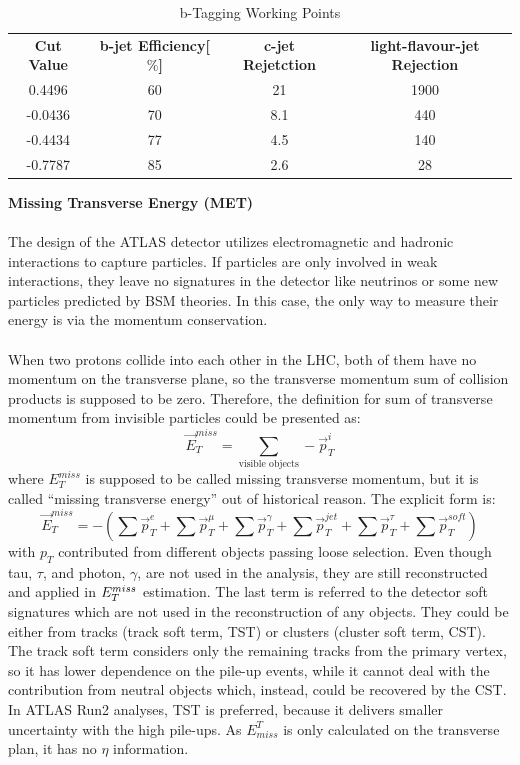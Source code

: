 \begin{table}[h]
	\caption{b-Tagging Working Points}
	\renewcommand{\arraystretch}{1.5}
	\centering
	\begin{adjustbox}{center}
		\begin{tabular}{|c | c | c | c |}
			\hline
			\hline
			{\bf Cut Value}    & {\bf b-jet Efficiency[$\%$]}  & {\bf c-jet Rejetction} & {\bf light-flavour-jet Rejection}\\
			0.4496 & 60 & 21 & 1900 \\
			-0.0436& 70 & 8.1& 440 \\
			-0.4434& 77 & 4.5&  140 \\
			-0.7787& 85 & 2.6&  28 \\
			\hline
		\end{tabular}
	\end{adjustbox}
	\label{Tab:b-tag}
\end{table}		
\noindent
{\bf Missing Transverse Energy (MET)}
\\
\\The design of the ATLAS detector utilizes electromagnetic and hadronic interactions to capture particles. If particles are only involved in weak interactions, they leave no signatures in the detector like neutrinos or some new particles predicted by BSM theories. In this case, the only way to measure their energy is via the momentum conservation. 
\\
\\When two protons collide into each other in the LHC, both of them have no momentum on the transverse plane, so the transverse momentum sum of collision products is supposed to be zero. Therefore, the definition for sum of transverse momentum from invisible particles could be presented as:
\begin{equation}
\vec{E}_{T}^{miss} = \sum_{\text{visible objects}} -\vec{p}_{T}^{i}
\end{equation}
where $E_{T}^{miss}$ is supposed to be called missing transverse momentum, but it is called ``missing transverse energy'' out of historical reason. The explicit form is:
\begin{equation}
\vec{E}_{T}^{miss} = -(\sum \vec{p}_{T}^{e} +\sum \vec{p}_{T}^{\mu} +\sum \vec{p}_{T}^{\gamma} +\sum \vec{p}_{T}^{jet} +\sum \vec{p}_{T}^{\tau}+\sum \vec{p}_{T}^{soft})
\end{equation}
with $p_{T}$ contributed from different objects passing loose selection. Even though tau, $\tau$, and photon, $\gamma$, are not used in the analysis, they are still reconstructed and applied in $E_{T}^{miss}$ estimation.  The last term is referred to the detector soft signatures which are not used in the reconstruction of any objects. They could be either from tracks (track soft term, TST) or clusters (cluster soft term, CST). The track soft term considers only the remaining tracks from the primary vertex, so it has lower dependence on the pile-up events, while it cannot deal with the contribution from neutral objects which, instead, could be recovered by the CST. In ATLAS Run2 analyses, TST is preferred, because it delivers smaller uncertainty with the high pile-ups. As $E^{T}_{miss}$ is only calculated on the transverse plan, it has no $\eta$ information. 

